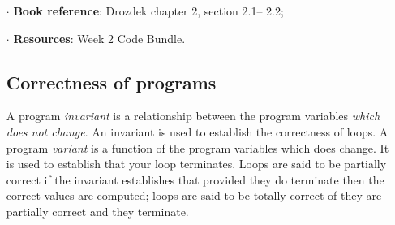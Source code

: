 \documentclass[twoside=false,DIV=14]{scrartcl}
\begin{document}
\begin{itemize}
\item[$\cdot$] {\bf Book reference}: Drozdek  chapter 2, section 2.1-- 2.2;
\item[$\cdot$] {\bf Resources}:  Week 2 Code Bundle.

\subsection*{Correctness of programs}

A program \emph{invariant} is a relationship between the program variables \emph{which does not change}. 
An invariant is used to establish the correctness of loops. A program \emph{variant} is a function of the program variables which does change. It is used to establish that your loop terminates. Loops are said to be partially correct if the invariant establishes that provided they do terminate then the correct values are computed; loops are said to be totally correct of they are partially correct and they terminate.


\end{itemize}
\end{document}
